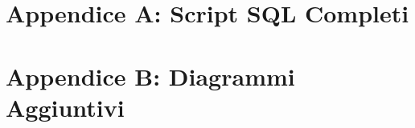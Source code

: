 \documentclass[12pt,a4paper]{article}
\begin{document}
\newpage

\appendix

\section{Appendice A: Script SQL Completi}


\section{Appendice B: Diagrammi Aggiuntivi}

\end{document}
